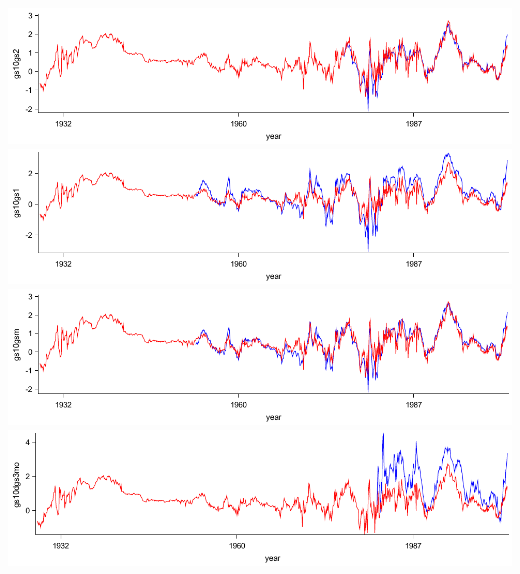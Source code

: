 \documentclass{article}
\begin{document}
\noindent
\includegraphics{series/gs10gs2}\\
\includegraphics{series/gs10gs1}\\
\includegraphics{series/gs10gsm}\\
\includegraphics{series/gs10dgs3mo}
\clearpage
\end{document}
